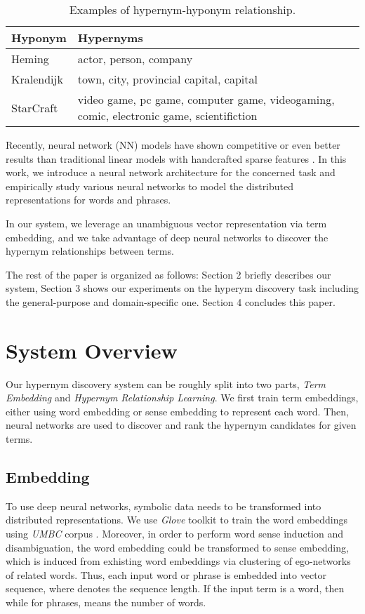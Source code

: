 \documentclass[11pt,a4paper]{article}
\begin{document}
	\begin{table}[h]\small
	\centering
	{\small
		\begin{tabular}{|l|p{5.4cm}|}
		\hline
		Hyponym & Hypernyms \\
		\hline
		Heming & actor, person, company\\
		\hline
		Kralendijk & town, city, provincial capital, capital\\
		\hline
		StarCraft & video game, pc game, computer game, videogaming, comic,	electronic game, scientifiction \\
		\hline
		\end{tabular}
	}
	\caption{\label{tab:example} Examples of hypernym-hyponym relationship.}
	\end{table}
	
	Recently, neural network (NN) models have shown competitive or even better results than traditional linear models with handcrafted sparse features \cite{Qin2016A,Pang2016I,Qin2016Shallow,Wang2016Connecting,Zhao2017A,Wang2017A,Qin2017Adversarial,Cai2017Pair,Zhao2017B,Li2018}. In this work, we introduce a neural network architecture for the concerned task and empirically study various neural networks to model the distributed representations for words and phrases. 
	
	In our system, we leverage an unambiguous vector representation via term embedding, and we take advantage of deep neural networks to discover the hypernym relationships between terms.
	
	The rest of the paper is organized as follows: Section 2 briefly describes our system, Section 3 shows our experiments on the hyperym discovery task including the general-purpose and domain-specific one. Section 4 concludes this paper.
	
	\section{System Overview}
	Our hypernym discovery system can be roughly split into two parts, \emph{Term Embedding} and \emph{Hypernym Relationship Learning}. We first train term embeddings, either using word embedding or sense embedding to represent each word. Then, neural networks are used to discover and rank the hypernym candidates for given terms.
	\subsection{Embedding}
	To use deep neural networks, symbolic data needs to be transformed into distributed representations\cite{Wang2016Learning,Qin2016A,Cai2016Neural,Zhang2016Probabilistic,Wang2016Converting,Wang2015Bilingual,Cai2017Fast}. We use \emph{Glove} toolkit to train the word embeddings using \emph{UMBC} corpus \cite{Han2013UMBC}. Moreover, in order to perform word sense induction and disambiguation, the word embedding could be transformed to sense embedding, which is induced from exhisting word embeddings via clustering of ego-networks \cite{pelevina-EtAl:2016:RepL4NLP} of related words. Thus, each input word or phrase is embedded into vector sequence,  where  denotes the sequence length. If the input term is a word, then  while for phrases,  means the number of words.
	
\end{document}
